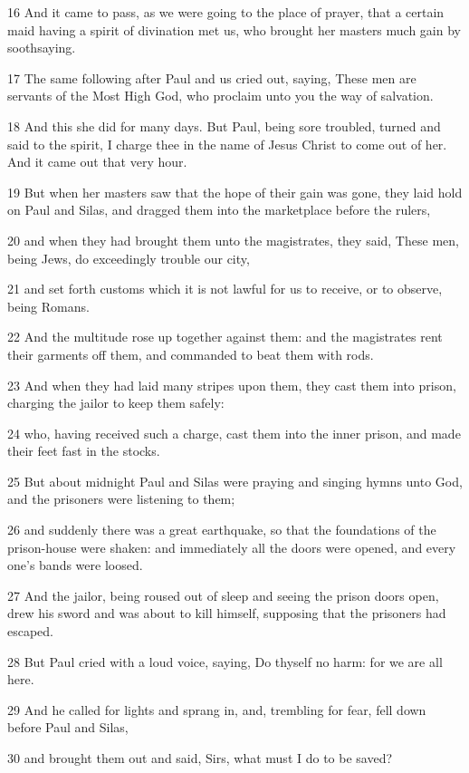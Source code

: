 \par 16 And it came to pass, as we were going to the place of prayer, that a certain maid having a spirit of divination met us, who brought her masters much gain by soothsaying.
\par 17 The same following after Paul and us cried out, saying, These men are servants of the Most High God, who proclaim unto you the way of salvation.
\par 18 And this she did for many days. But Paul, being sore troubled, turned and said to the spirit, I charge thee in the name of Jesus Christ to come out of her. And it came out that very hour.
\par 19 But when her masters saw that the hope of their gain was gone, they laid hold on Paul and Silas, and dragged them into the marketplace before the rulers,
\par 20 and when they had brought them unto the magistrates, they said, These men, being Jews, do exceedingly trouble our city,
\par 21 and set forth customs which it is not lawful for us to receive, or to observe, being Romans.
\par 22 And the multitude rose up together against them: and the magistrates rent their garments off them, and commanded to beat them with rods.
\par 23 And when they had laid many stripes upon them, they cast them into prison, charging the jailor to keep them safely:
\par 24 who, having received such a charge, cast them into the inner prison, and made their feet fast in the stocks.
\par 25 But about midnight Paul and Silas were praying and singing hymns unto God, and the prisoners were listening to them;
\par 26 and suddenly there was a great earthquake, so that the foundations of the prison-house were shaken: and immediately all the doors were opened, and every one's bands were loosed.
\par 27 And the jailor, being roused out of sleep and seeing the prison doors open, drew his sword and was about to kill himself, supposing that the prisoners had escaped.
\par 28 But Paul cried with a loud voice, saying, Do thyself no harm: for we are all here.
\par 29 And he called for lights and sprang in, and, trembling for fear, fell down before Paul and Silas,
\par 30 and brought them out and said, Sirs, what must I do to be saved?

